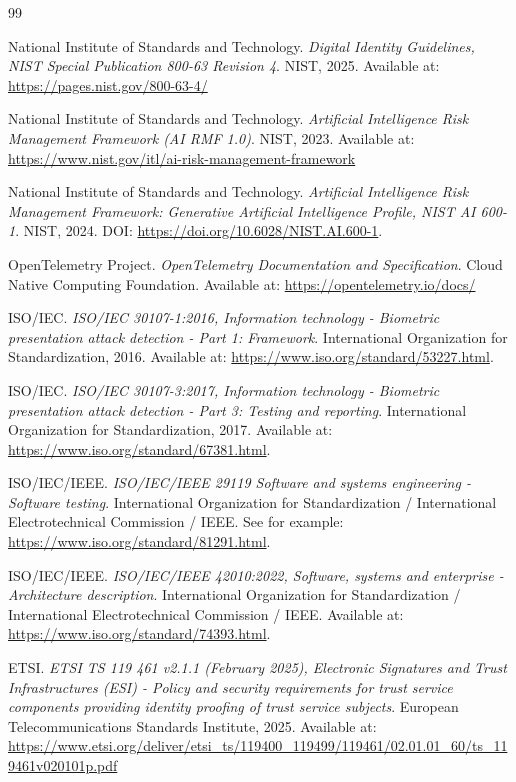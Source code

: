 \documentclass[11pt,a4paper]{article}
\begin{document}
\begin{thebibliography}{99}

National Institute of Standards and Technology.
\textit{Digital Identity Guidelines, NIST Special Publication 800-63 Revision 4}.
NIST, 2025. Available at: \url{https://pages.nist.gov/800-63-4/}

National Institute of Standards and Technology.
\textit{Artificial Intelligence Risk Management Framework (AI RMF 1.0)}.
NIST, 2023. Available at: \url{https://www.nist.gov/itl/ai-risk-management-framework}

National Institute of Standards and Technology.
\textit{Artificial Intelligence Risk Management Framework: Generative Artificial Intelligence Profile, NIST AI 600-1}.
NIST, 2024. DOI: \url{https://doi.org/10.6028/NIST.AI.600-1}.

OpenTelemetry Project.
\textit{OpenTelemetry Documentation and Specification}.
Cloud Native Computing Foundation. Available at: \url{https://opentelemetry.io/docs/}

ISO/IEC.
\textit{ISO/IEC 30107-1:2016, Information technology - Biometric presentation attack detection - Part 1: Framework}.
International Organization for Standardization, 2016. Available at: \url{https://www.iso.org/standard/53227.html}.

ISO/IEC.
\textit{ISO/IEC 30107-3:2017, Information technology - Biometric presentation attack detection - Part 3: Testing and reporting}.
International Organization for Standardization, 2017. Available at: \url{https://www.iso.org/standard/67381.html}.

ISO/IEC/IEEE.
\textit{ISO/IEC/IEEE 29119 Software and systems engineering - Software testing}.
International Organization for Standardization / International Electrotechnical Commission / IEEE. See for example: \url{https://www.iso.org/standard/81291.html}.

ISO/IEC/IEEE.
\textit{ISO/IEC/IEEE 42010:2022, Software, systems and enterprise - Architecture description}.
International Organization for Standardization / International Electrotechnical Commission / IEEE. Available at: \url{https://www.iso.org/standard/74393.html}.

ETSI.
\textit{ETSI TS 119 461 v2.1.1 (February 2025), Electronic Signatures and Trust Infrastructures (ESI) - Policy and security requirements for trust service components providing identity proofing of trust service subjects}.
European Telecommunications Standards Institute, 2025. Available at: \url{https://www.etsi.org/deliver/etsi_ts/119400_119499/119461/02.01.01_60/ts_119461v020101p.pdf}


\end{thebibliography}
\end{document}
